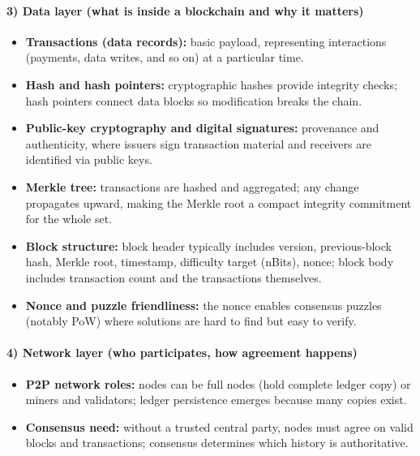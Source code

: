 \documentclass[11pt,a4paper]{article}
\begin{document}
\paragraph{3) Data layer (what is inside a blockchain and why it matters)}
\begin{itemize}[leftmargin=*]
  \item \textbf{Transactions (data records):} basic payload, representing interactions (payments, data writes, and so on) at a particular time.
  \item \textbf{Hash and hash pointers:} cryptographic hashes provide integrity checks; hash pointers connect data blocks so modification breaks the chain.
  \item \textbf{Public-key cryptography and digital signatures:} provenance and authenticity, where issuers sign transaction material and receivers are identified via public keys.
  \item \textbf{Merkle tree:} transactions are hashed and aggregated; any change propagates upward, making the Merkle root a compact integrity commitment for the whole set.
  \item \textbf{Block structure:} block header typically includes version, previous-block hash, Merkle root, timestamp, difficulty target (nBits), nonce; block body includes transaction count and the transactions themselves.
  \item \textbf{Nonce and puzzle friendliness:} the nonce enables consensus puzzles (notably PoW) where solutions are hard to find but easy to verify.
\end{itemize}

\paragraph{4) Network layer (who participates, how agreement happens)}
\begin{itemize}[leftmargin=*]
  \item \textbf{P2P network roles:} nodes can be full nodes (hold complete ledger copy) or miners and validators; ledger persistence emerges because many copies exist.
  \item \textbf{Consensus need:} without a trusted central party, nodes must agree on valid blocks and transactions; consensus determines which history is authoritative.
\end{itemize}
\end{document}
